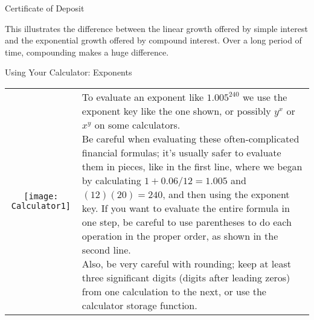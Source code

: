 \begin{example}[https://www.youtube.com/watch?v=UCQJgC0nRxA]{Certificate of Deposit}
\begin{center}
\end{center}
This illustrates the difference between the linear growth offered by simple interest and the exponential growth offered by compound interest.  Over a long period of time, compounding makes a huge difference.
\end{example}

\begin{proc}{Using Your Calculator: Exponents}
\begin{tabular}{c l}
\texttt{[image: Calculator1]} & \parbox[b]{3in}{To evaluate an exponent like $1.005^{240}$ we use the exponent key like the one shown, or possibly $\boxed{y^x}$ or $\boxed{x^y}$ on some calculators.\\  Be careful when evaluating these often-complicated financial formulas; it's usually safer to evaluate them in pieces, like in the first line, where we began by calculating $1+0.06/12 = 1.005$ and $(12)(20)=240$, and then using the exponent key.  If you want to evaluate the entire formula in one step, be careful to use parentheses to do each operation in the proper order, as shown in the second line.\\  Also, be very careful with rounding; keep at least three significant digits (digits after leading zeros) from one calculation to the next, or use the calculator storage function.}
\end{tabular}
\end{proc}

